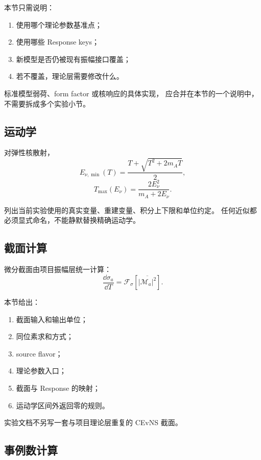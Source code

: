 本节只需说明：
\begin{enumerate}
  \item 使用哪个理论参数基准点；
  \item 使用哪些 Response keys；
  \item 新模型是否仍被现有振幅接口覆盖；
  \item 若不覆盖，理论层需要修改什么。
\end{enumerate}

标准模型弱荷、form factor 或核响应的具体实现，
应合并在本节的一个说明中，不需要拆成多个实验小节。

\subsection{运动学}

对弹性核散射，
\begin{equation}
  E_{\nu,\min}(T)
  =
  \frac{
    T+\sqrt{T^2+2m_AT}
  }{2},
\end{equation}
\begin{equation}
  T_{\max}(E_\nu)
  =
  \frac{2E_\nu^2}{m_A+2E_\nu}.
\end{equation}

列出当前实验使用的真实变量、重建变量、积分上下限和单位约定。
任何近似都必须显式命名，不能静默替换精确运动学。

\subsection{截面计算}

微分截面由项目振幅层统一计算：
\begin{equation}
  \frac{\dd\sigma_a}{\dd T}
  =
  \mathcal F_\sigma
  \left[
    \overline{
      \left|
        \mathcal M_a
      \right|^2
    }
  \right].
\end{equation}

本节给出：
\begin{enumerate}
  \item 截面输入和输出单位；
  \item 同位素求和方式；
  \item source flavor；
  \item 理论参数入口；
  \item 截面与 Response 的映射；
  \item 运动学区间外返回零的规则。
\end{enumerate}

实验文档不另写一套与项目理论层重复的 CEvNS 截面。

\subsection{事例数计算}


